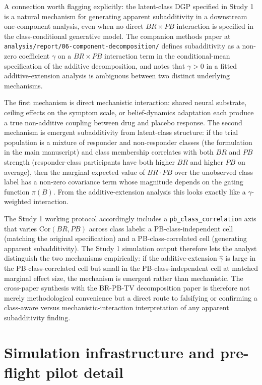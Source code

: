 \documentclass[
  11pt,
]{article}
\begin{document}
A connection worth flagging explicitly: the latent-class DGP specified
in Study 1 is a natural mechanism for generating apparent subadditivity
in a downstream one-component analysis, even when no direct \(BR \times
PB\) interaction is specified in the class-conditional generative model.
The companion methods paper at \texttt{analysis/report/06-component-decomposition/}
defines subadditivity as a non-zero coefficient \(\gamma\) on a
\(BR \times PB\) interaction term in the conditional-mean specification
of the additive decomposition, and notes that \(\gamma > 0\) in a fitted
additive-extension analysis is ambiguous between two distinct
underlying mechanisms.

The first mechanism is direct mechanistic interaction: shared neural
substrate, ceiling effects on the symptom scale, or belief-dynamics
adaptation each produce a true non-additive coupling between drug and
placebo response. The second mechanism is emergent subadditivity from
latent-class structure: if the trial population is a mixture of
responder and non-responder classes (the formulation in the main
manuscript) and class membership correlates with both \(BR\) and \(PB\)
strength (responder-class participants have both higher \(BR\) and
higher \(PB\) on average), then the marginal expected value of
\(BR \cdot PB\) over the unobserved class label has a non-zero covariance
term whose magnitude depends on the gating function \(\pi(B)\). From the
additive-extension analysis this looks exactly like a
\(\gamma\)-weighted interaction.

The Study 1 working protocol accordingly includes a
\texttt{pb\_class\_correlation} axis that varies
\(\mathrm{Cor}(BR, PB)\) across class labels: a PB-class-independent
cell (matching the original specification) and a PB-class-correlated
cell (generating apparent subadditivity). The Study 1 simulation output
therefore lets the analyst distinguish the two mechanisms empirically:
if the additive-extension \(\hat{\gamma}\) is large in the
PB-class-correlated cell but small in the PB-class-independent cell at
matched marginal effect size, the mechanism is emergent rather than
mechanistic. The cross-paper synthesis with the BR-PB-TV decomposition
paper is therefore not merely methodological convenience but a direct
route to falsifying or confirming a class-aware versus
mechanistic-interaction interpretation of any apparent subadditivity
finding.

\section{Simulation infrastructure and pre-flight pilot detail}\label{simulation-infrastructure-and-pre-flight-pilot-detail}
\end{document}
